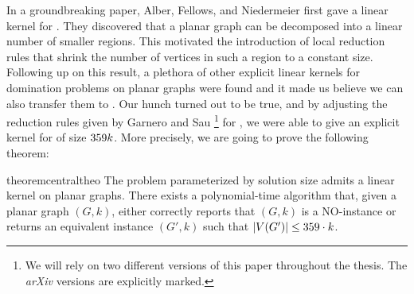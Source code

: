 In a groundbreaking paper, Alber, Fellows, and Niedermeier \cite{Alber2004} first gave a linear kernel for \pdom. 
They discovered that a planar graph can be decomposed into a linear number of smaller regions. 
This motivated the introduction of local reduction rules that shrink the number of vertices in such a region to a constant size. 
Following up on this result, a plethora of other explicit linear kernels for domination problems on planar graphs were found \cite{Guo2007, Garnero2017, Luo2013, Alber2006} and it made us believe we can also transfer them to \psdom.
Our hunch turned out to be true, and by adjusting the reduction rules given by Garnero and Sau \cite{Garnero2018}\footnote{We will rely on two different versions of this paper throughout the thesis. The \textit{arXiv} versions are explicitly marked.} for \ptdom, we were able to give an explicit kernel for \psdom of size $359 k$. 
More precisely, we are going to prove the following theorem:

\begin{restatable}[]{theorem}{centraltheo}\label{thm:central}
    The \sdom problem parameterized by solution size admits a linear kernel on planar graphs. There exists a polynomial-time algorithm that, given a planar graph $(G, k)$, either correctly reports that $(G, k)$ is a NO-instance or returns an equivalent instance $(G', k)$ such that $\abs{V(G')} \leq 359 \cdot k$.
\end{restatable}